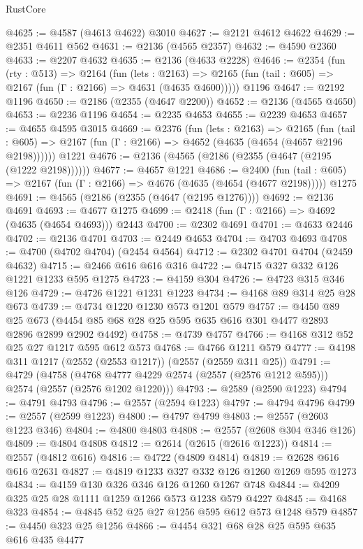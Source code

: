 \begin{lexlean}{RustCore}
\begin{coremodule}
@4625 := @4587 (@4613 @4622) @3010
@4627 := @2121 @4612 @4622
@4629 := @2351 @4611 @562
@4631 := @2136 (@4565 @2357)
@4632 := @4590 @2360
@4633 := @2207 @4632
@4635 := @2136 (@4633 @2228)
@4646 := @2354
    (fun (rty : @513) =>
    @2164
      (fun (lets : @2163) =>
      @2165 (fun (tail : @605) => @2167 (fun (Γ : @2166) => @4631 (@4635 @4600)))))
    @1196
@4647 := @2192 @1196
@4650 := @2186 (@2355 (@4647 @2200))
@4652 := @2136 (@4565 @4650)
@4653 := @2236 @1196
@4654 := @2235 @4653
@4655 := @2239 @4653
@4657 := @4655 @4595 @3015
@4669 := @2376
    (fun (lets : @2163) =>
    @2165
      (fun (tail : @605) => @2167 (fun (Γ : @2166) => @4652 (@4635 (@4654 (@4657 @2196 @2198))))))
    @1221
@4676 := @2136 (@4565 (@2186 (@2355 (@4647 (@2195 (@1222 @2198))))))
@4677 := @4657 @1221
@4686 := @2400
    (fun (tail : @605) => @2167 (fun (Γ : @2166) => @4676 (@4635 (@4654 (@4677 @2198)))))
    @1275
@4691 := @4565 (@2186 (@2355 (@4647 (@2195 @1276))))
@4692 := @2136 @4691
@4693 := @4677 @1275
@4699 := @2418 (fun (Γ : @2166) => @4692 (@4635 (@4654 @4693))) @2443
@4700 := @2302 @4691
@4701 := @4633 @2446
@4702 := @2136 @4701
@4703 := @2449 @4653
@4704 := @4703 @4693
@4708 := @4700 (@4702 @4704) (@2454 @4564)
@4712 := @2302 @4701 @4704 (@2459 @4632)
@4715 := @2466 @616 @616 @316
@4722 := @4715 @327 @332 @126 @1221 @1233 @595 @1275
@4723 := @4159 @304
@4726 := @4723 @315 @346 @126
@4729 := @4726 @1221 @1231 @1223
@4734 := @4168 @89 @314 @25 @28 @673
@4739 := @4734 @1220 @1230 @573 @1201 @579
@4757 := @4450
    @89
    @25
    @673
    (@4454 @85 @68 @28 @25 @595 @635 @616 @301 @4477 @2893 @2896 @2899 @2902 @4492)
@4758 := @4739 @4757
@4766 := @4168 @312 @52 @25 @27 @1217 @595 @612 @573
@4768 := @4766 @1211 @579
@4777 := @4198 @311 @1217 (@2552 (@2553 @1217)) (@2557 (@2559 @311 @25))
@4791 := @4729
    (@4758 (@4768 @4777 @4229 @2574 (@2557 (@2576 @1212 @595))) @2574 (@2557 (@2576 @1202 @1220)))
@4793 := @2589 (@2590 @1223)
@4794 := @4791 @4793
@4796 := @2557 (@2594 @1223)
@4797 := @4794 @4796
@4799 := @2557 (@2599 @1223)
@4800 := @4797 @4799
@4803 := @2557 (@2603 @1223 @346)
@4804 := @4800 @4803
@4808 := @2557 (@2608 @304 @346 @126)
@4809 := @4804 @4808
@4812 := @2614 (@2615 (@2616 @1223))
@4814 := @2557 (@4812 @616)
@4816 := @4722 (@4809 @4814)
@4819 := @2628 @616 @616 @2631
@4827 := @4819 @1233 @327 @332 @126 @1260 @1269 @595 @1273
@4834 := @4159 @130 @326 @346 @126 @1260 @1267 @748
@4844 := @4209 @325 @25 @28 @1111 @1259 @1266 @573 @1238 @579 @4227
@4845 := @4168 @323
@4854 := @4845 @52 @25 @27 @1256 @595 @612 @573 @1248 @579
@4857 := @4450 @323 @25 @1256
@4866 := @4454 @321 @68 @28 @25 @595 @635 @616 @435 @4477

\end{coremodule}
\end{lexlean}
